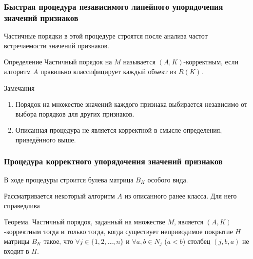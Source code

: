 \documentclass[
	11pt,
]{beamer}
\begin{document}
\begin{frame}
	\frametitle{Быстрая процедура независимого линейного упорядочения значений признаков}
    Частичные порядки в этой процедуре строятся после анализа частот встречаемости значений признаков.

	\begin{block}{Определение}
		Частичный порядок на $M$ называется $(A, K)$-корректным, если алгоритм $A$ правильно классифицирует каждый объект из $R(K)$.
	\end{block}

	\begin{exampleblock}{Замечания}
        \begin{enumerate}
		    \item Порядок на множестве значений каждого признака выбирается независимо от выбора порядков для других признаков.
		    \item Описанная процедура не является корректной в смысле определения, приведённого выше.
        \end{enumerate}
	\end{exampleblock}
\end{frame}

\begin{frame}
	\frametitle{Процедура корректного упорядочения значений признаков}
    В ходе процедуры строится булева матрица $B_K$ особого вида.

    \bigskip

    Рассматривается некоторый алгоритм $A$ из описанного ранее класса. Для него справедлива
	\begin{block}{Теорема.}
		Частичный порядок, заданный на множестве $M$, является $(A, K)$-корректным тогда и только тогда, когда существует неприводимое покрытие $H$ матрицы $B_K$ такое, что $\forall j \in \{1, 2, ..., n\}$ и $\forall a, b \in N_j$ ($a < b$) столбец $(j, b, a)$ не входит в $H$.
	\end{block}
\end{frame}
\end{document}
